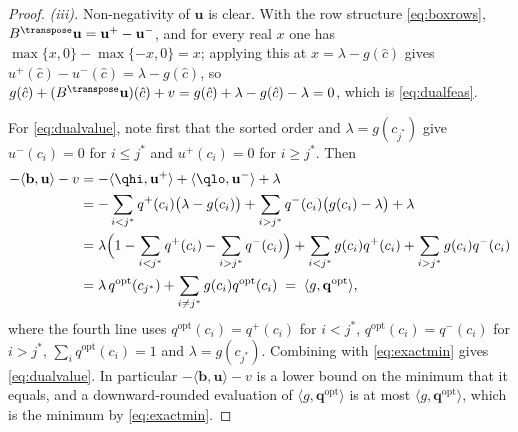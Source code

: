 \begin{proof}
\emph{(iii).} Non-negativity of $\mathbf{u}$ is clear. With the row structure
\eqref{eq:boxrows}, $B^{\transpose}\mathbf{u}=\mathbf{u}^{+}-\mathbf{u}^{-}$,
and for every real $x$ one has $\max\{x,0\}-\max\{-x,0\}=x$; applying this at
$x=\lambda-g(\hat c)$ gives
$u^{+}(\hat c)-u^{-}(\hat c)=\lambda-g(\hat c)$, so
$g(\hat c)+(B^{\transpose}\mathbf{u})(\hat c)+v
=g(\hat c)+\lambda-g(\hat c)-\lambda=0$, which is \eqref{eq:dualfeas}.

For \eqref{eq:dualvalue}, note first that the sorted order and
$\lambda=g(c_{j^{\ast}})$ give $u^{-}(c_i)=0$ for $i\le j^{\ast}$ and
$u^{+}(c_i)=0$ for $i\ge j^{\ast}$. Then
\begin{align*}
  -\langle\mathbf{b},\mathbf{u}\rangle-v
  &=-\langle\qhi,\mathbf{u}^{+}\rangle+\langle\qlo,\mathbf{u}^{-}\rangle
    +\lambda\\
  &=-\sum_{i<j^{\ast}}q^{+}(c_i)\big(\lambda-g(c_i)\big)
    +\sum_{i>j^{\ast}}q^{-}(c_i)\big(g(c_i)-\lambda\big)+\lambda\\
  &=\lambda\Big(1-\sum_{i<j^{\ast}}q^{+}(c_i)-\sum_{i>j^{\ast}}q^{-}(c_i)\Big)
    +\sum_{i<j^{\ast}}g(c_i)q^{+}(c_i)+\sum_{i>j^{\ast}}g(c_i)q^{-}(c_i)\\
  &=\lambda\,q^{\mathrm{opt}}(c_{j^{\ast}})+\sum_{i\neq j^{\ast}}g(c_i)q^{\mathrm{opt}}(c_i)
   \;=\;\langle g,\mathbf{q}^{\mathrm{opt}}\rangle ,
\end{align*}
where the fourth line uses $q^{\mathrm{opt}}(c_i)=q^{+}(c_i)$ for $i<j^{\ast}$,
$q^{\mathrm{opt}}(c_i)=q^{-}(c_i)$ for $i>j^{\ast}$, $\sum_i q^{\mathrm{opt}}(c_i)=1$ and
$\lambda=g(c_{j^{\ast}})$. Combining with \eqref{eq:exactmin} gives
\eqref{eq:dualvalue}. In particular $-\langle\mathbf{b},\mathbf{u}\rangle-v$
is a lower bound on the minimum that it equals, and a downward-rounded
evaluation of $\langle g,\mathbf{q}^{\mathrm{opt}}\rangle$ is at most
$\langle g,\mathbf{q}^{\mathrm{opt}}\rangle$, which is the minimum by
\eqref{eq:exactmin}.
\end{proof}
